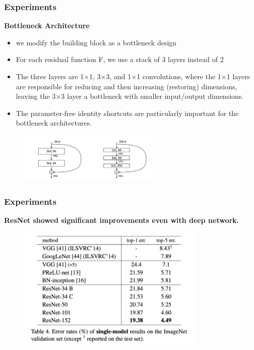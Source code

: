 \documentclass[
	11pt, %
]{beamer}
\begin{document}
\begin{frame}
	\frametitle{Experiments}

	\textbf{Bottleneck Architecture}

	\begin{itemize}
		\item we modify the building block as a bottleneck design
		\item For each residual function F, we use a stack of 3 layers instead of 2
		\item The three layers are 1×1, 3×3, and 1×1 convolutions, where the 1×1 layers are responsible for reducing and then increasing (restoring) dimensions, leaving the 3×3 layer a bottleneck with smaller input/output dimensions.
		\item The parameter-free identity shortcuts are particularly important for the bottleneck architectures.
	\end{itemize}

	\begin{figure}
		\centering
		\includegraphics[width=0.6\textwidth]{./images/Screenshot 2025-05-20 at 12.17.56.png}
	\end{figure}
\end{frame}

\begin{frame}
	\frametitle{Experiments}

	\textbf{ResNet showed significant improvements even with deep network.}

	\begin{figure}
		\centering
		\includegraphics[width=0.8\textwidth]{./images/Screenshot 2025-05-20 at 0.34.11.png}
	\end{figure}
\end{frame}
\end{document}
